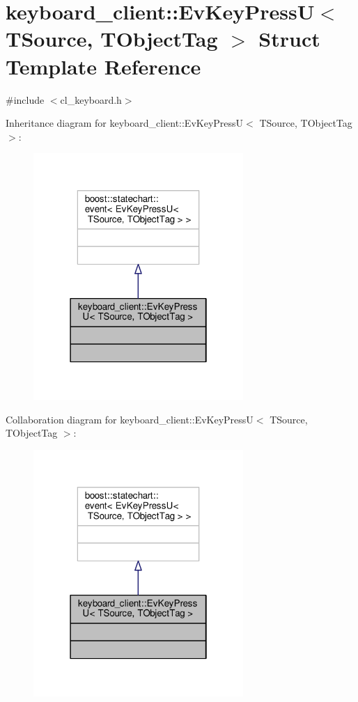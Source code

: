\hypertarget{structkeyboard__client_1_1EvKeyPressU}{}\section{keyboard\+\_\+client\+:\+:Ev\+Key\+PressU$<$ T\+Source, T\+Object\+Tag $>$ Struct Template Reference}
\label{structkeyboard__client_1_1EvKeyPressU}


{\ttfamily \#include $<$cl\+\_\+keyboard.\+h$>$}



Inheritance diagram for keyboard\+\_\+client\+:\+:Ev\+Key\+PressU$<$ T\+Source, T\+Object\+Tag $>$\+:\nopagebreak
\begin{figure}[H]
\begin{center}
\leavevmode
\includegraphics[width=226pt]{structkeyboard__client_1_1EvKeyPressU__inherit__graph}
\end{center}
\end{figure}


Collaboration diagram for keyboard\+\_\+client\+:\+:Ev\+Key\+PressU$<$ T\+Source, T\+Object\+Tag $>$\+:\nopagebreak
\begin{figure}[H]
\begin{center}
\leavevmode
\includegraphics[width=226pt]{structkeyboard__client_1_1EvKeyPressU__coll__graph}
\end{center}
\end{figure}


